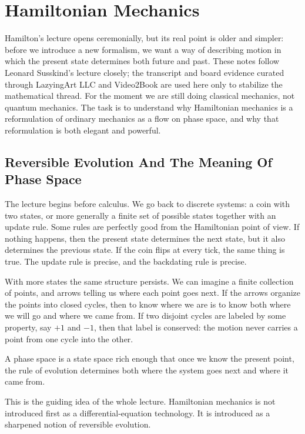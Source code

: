 \chapter{Hamiltonian Mechanics}

Hamilton's lecture opens ceremonially, but its real point is older and simpler: before we introduce a new formalism, we want a way of describing motion in which the present state determines both future and past. These notes follow Leonard Susskind's lecture closely; the transcript and board evidence curated through LazyingArt LLC and Video2Book are used here only to stabilize the mathematical thread. For the moment we are still doing classical mechanics, not quantum mechanics. The task is to understand why Hamiltonian mechanics is a reformulation of ordinary mechanics as a flow on phase space, and why that reformulation is both elegant and powerful.

\section{Reversible Evolution And The Meaning Of Phase Space}

The lecture begins before calculus. We go back to discrete systems: a coin with two states, or more generally a finite set of possible states together with an update rule. Some rules are perfectly good from the Hamiltonian point of view. If nothing happens, then the present state determines the next state, but it also determines the previous state. If the coin flips at every tick, the same thing is true. The update rule is precise, and the backdating rule is precise.

With more states the same structure persists. We can imagine a finite collection of points, and arrows telling us where each point goes next. If the arrows organize the points into closed cycles, then to know where we are is to know both where we will go and where we came from. If two disjoint cycles are labeled by some property, say \(+1\) and \(-1\), then that label is conserved: the motion never carries a point from one cycle into the other.

\begin{definition}
A phase space is a state space rich enough that once we know the present point, the rule of evolution determines both where the system goes next and where it came from.
\end{definition}

This is the guiding idea of the whole lecture. Hamiltonian mechanics is not introduced first as a differential-equation technology. It is introduced as a sharpened notion of reversible evolution.

